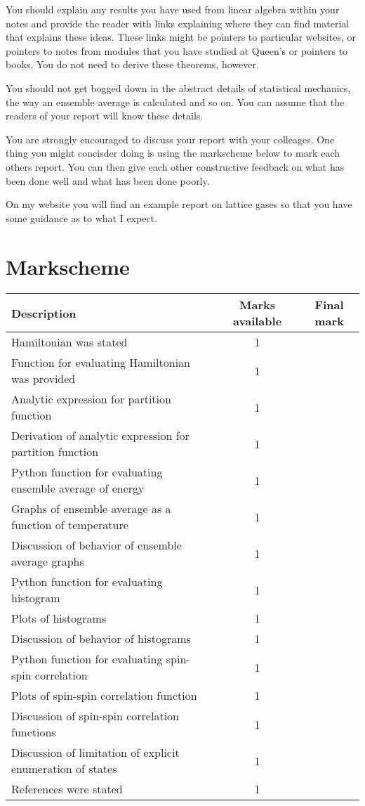 \documentclass[paper=a4, fontsize=11pt]{scrartcl}
\numberwithin{equation}{section}
\numberwithin{figure}{section}
\numberwithin{table}{section}
\begin{document}
You should explain any results you have used from linear algebra within your notes and provide the reader with links explaining where they can find material that explains 
these ideas.  These links might be pointers to particular websites, or pointers to notes from modules that you have studied at Queen's or pointers to books.  You do not need 
to derive these theorems, however.

You should not get bogged down in the abstract details of statistical mechanics, the way an ensemble average is calculated and so on.  You can assume that the readers of your 
report will know these details.

You are strongly encouraged to discuss your report with your colleages.  One thing you might concisder doing is using the markscheme below to mark each others report.  
You can then give each other constructive feedback on what has been done well and what has been done poorly.

On my website you will find an example report on lattice gases so that you have some guidance as to what I expect.

\section{Markscheme}

\begin{center}
\begin{tabular}{ l | c | c }
Description & Marks available & Final mark \\ \hline
Hamiltonian was stated & 1 & \\
Function for evaluating Hamiltonian was provided & 1 & \\
Analytic expression for partition function & 1 & \\
Derivation of analytic expression for partition function & 1 & \\
Python function for evaluating ensemble average of energy & 1 & \\
Graphs of ensemble average as a function of temperature & 1 & \\
Discussion of behavior of ensemble average graphs & 1 & \\
Python function for evaluating histogram & 1 & \\
Plots of histograms & 1 & \\
Discussion of behavior of histograms & 1 & \\
Python function for evaluating spin-spin correlation & 1 & \\
Plots of spin-spin correlation function & 1 & \\
Discussion of spin-spin correlation functions & 1 & \\
Discussion of limitation of explicit enumeration of states & 1 & \\
References were stated & 1 & 
\end{tabular}
\end{center}
\end{document}
